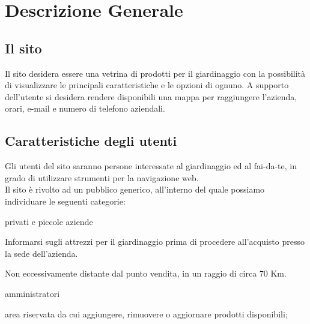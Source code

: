 \section{Descrizione Generale}{
	\subsection{Il sito}{
		Il sito desidera essere una vetrina di prodotti per il giardinaggio con la possibilità di visualizzare le principali caratteristiche e le opzioni di ognuno.
		A supporto dell'utente si desidera rendere disponibili una mappa per raggiungere l'azienda, orari, e-mail e numero di telefono aziendali.
	}
	\subsection{Caratteristiche degli utenti}{
		Gli utenti del sito saranno persone interessate al giardinaggio ed al fai-da-te, in grado di utilizzare strumenti per la navigazione web. \\
		Il sito è rivolto ad un pubblico generico, all'interno del quale possiamo individuare le seguenti categorie:
		\begin{description}\itemsep1pt
			\item[Categoria di utenti:] privati e piccole aziende
			\begin{description}\itemsep1pt
				\item[Funzionalità:] Informarsi sugli attrezzi per il giardinaggio prima di procedere all'acquisto presso la sede dell'azienda.
				\item[Termini generali:] Non eccessivamente distante dal punto vendita, in un raggio di circa 70 Km.
			\end{description}
			\item[Categoria di utenti:] amministratori
			\begin{description}\itemsep1pt
				\item[Funzionalità:] area riservata da cui aggiungere, rimuovere o aggiornare prodotti disponibili;
			\end{description}
		\end{description}
	}
}
